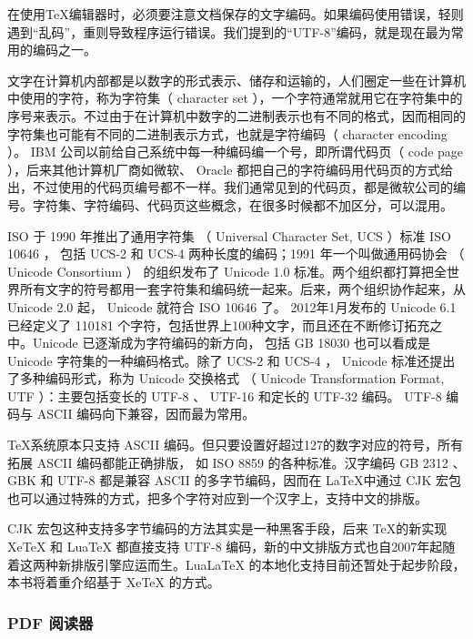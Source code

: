 {
    \qquad 在使用\TeX 编辑器时，必须要注意文档保存的文字编码。如果编码使用错误，轻则遇到“乱码”，重则导致程序运行错误。我们提到的“UTF-8”编码，就是现在最为常用的编码之一。

    \qquad 文字在计算机内部都是以数字的形式表示、储存和运输的，人们圈定一些在计算机中使用的字符，称为字符集（ character set ），一个字符通常就用它在字符集中的序号来表示。不过由于在计算机中数字的二进制表示也有不同的格式，因而相同的字符集也可能有不同的二进制表示方式，也就是字符编码（ character encoding ）。 IBM 公司以前给自己系统中每一种编码编一个号，即所谓代码页（ code page ），后来其他计算机厂商如微软、 Oracle 都把自己的字符编码用代码页的方式给出，不过使用的代码页编号都不一样。我们通常见到的代码页，都是微软公司的编号。字符集、字符编码、代码页这些概念，在很多时候都不加区分，可以混用。

    \qquad ISO 于 1990 年推出了通用字符集 （ Universal Character Set, UCS ）标准 ISO 10646 ， 包括 UCS-2 和 UCS-4 两种长度的编码；1991 年一个叫做通用码协会 （ Unicode Consortium ） 的组织发布了 Unicode 1.0 标准。两个组织都打算把全世界所有文字的符号都用一套字符集和编码统一起来。后来，两个组织协作起来，从 Unicode 2.0 起， Unicode 就符合 ISO 10646 了。 2012年1月发布的 Unicode 6.1 已经定义了 110181 个字符，包括世界上100种文字，而且还在不断修订拓充之中。\footnotemark Unicode 已逐渐成为字符编码的新方向， 包括 GB 18030 也可以看成是 Unicode 字符集的一种编码格式。除了 UCS-2 和 UCS-4 ， Unicode 标准还提出了多种编码形式，称为 Unicode 交换格式 （ Unicode Transformation Format, UTF ）：主要包括变长的 UTF-8 、 UTF-16 和定长的 UTF-32 编码。 UTF-8 编码与 ASCII 编码向下兼容，因而最为常用。

    \qquad \TeX 系统原本只支持 ASCII 编码。但只要设置好超过127的数字对应的符号，所有拓展 ASCII 编码都能正确排版， 如 ISO 8859 的各种标准。汉字编码 GB 2312 、 GBK 和 UTF-8 都是兼容 ASCII 的多字节编码，因而在 \LaTeX 中通过 CJK 宏包 也可以通过特殊的方式，把多个字符对应到一个汉字上，支持中文的排版。

    \qquad CJK 宏包这种支持多字节编码的方法其实是一种黑客手段，后来 \TeX 的新实现 XeTeX 和 LuaTeX 都直接支持 UTF-8 编码，新的中文排版方式也自2007年起随着这两种新排版引擎应运而生。LuaLaTeX 的本地化支持目前还暂处于起步阶段，本书将着重介绍基于 XeTeX 的方式。
    }


\subsubsection{PDF 阅读器}

